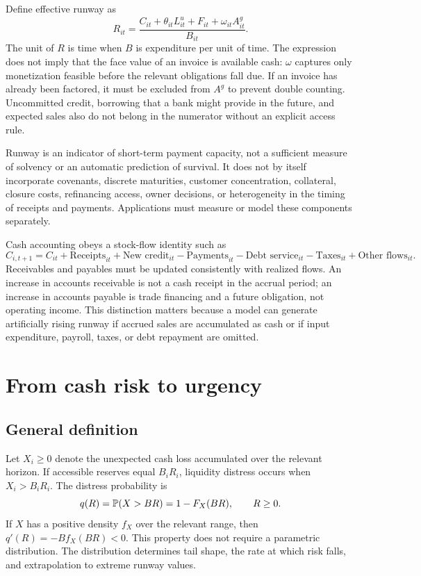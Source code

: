\documentclass[11pt,a4paper]{article}
\begin{document}
Define effective runway as
\begin{equation}
R_{it}=\frac{C_{it}+\theta_{it}L^u_{it}+F_{it}+\omega_{it}A^g_{it}}{B_{it}}. \label{eq:runway}
\end{equation}
The unit of $R$ is time when $B$ is expenditure per unit of time. The expression does not imply that the face value of an invoice is available cash: $\omega$ captures only monetization feasible before the relevant obligations fall due. If an invoice has already been factored, it must be excluded from $A^g$ to prevent double counting. Uncommitted credit, borrowing that a bank might provide in the future, and expected sales also do not belong in the numerator without an explicit access rule.

Runway is an indicator of short-term payment capacity, not a sufficient measure of solvency or an automatic prediction of survival. It does not by itself incorporate covenants, discrete maturities, customer concentration, collateral, closure costs, refinancing access, owner decisions, or heterogeneity in the timing of receipts and payments. Applications must measure or model these components separately.

Cash accounting obeys a stock-flow identity such as
\begin{equation}
C_{i,t+1}=C_{it}+\text{Receipts}_{it}+\text{New credit}_{it}-\text{Payments}_{it}-\text{Debt service}_{it}-\text{Taxes}_{it}+\text{Other flows}_{it}. \label{eq:cashflow}
\end{equation}
Receivables and payables must be updated consistently with realized flows. An increase in accounts receivable is not a cash receipt in the accrual period; an increase in accounts payable is trade financing and a future obligation, not operating income. This distinction matters because a model can generate artificially rising runway if accrued sales are accumulated as cash or if input expenditure, payroll, taxes, or debt repayment are omitted.

\section{From cash risk to urgency}
\subsection{General definition}
Let $X_i\geq0$ denote the unexpected cash loss accumulated over the relevant horizon. If accessible reserves equal $B_iR_i$, liquidity distress occurs when $X_i>B_iR_i$. The distress probability is
\begin{equation}
q(R)=\mathbb P(X>BR)=1-F_X(BR),\qquad R\geq0. \label{eq:qgeneral}
\end{equation}
If $X$ has a positive density $f_X$ over the relevant range, then $q'(R)=-Bf_X(BR)<0$. This property does not require a parametric distribution. The distribution determines tail shape, the rate at which risk falls, and extrapolation to extreme runway values.
\end{document}
